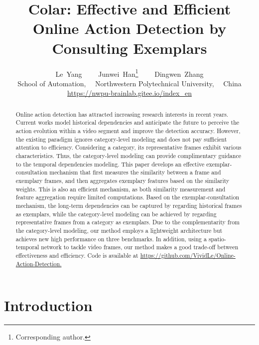 \documentclass[10pt,twocolumn,letterpaper]{article}
\begin{document}
\title{Colar: Effective and Efficient Online Action Detection by Consulting Exemplars}
\author{Le\ Yang \ \ \ \ Junwei\ Han\thanks{Corresponding author.} \ \ \ \ Dingwen\ Zhang \\School of Automation, \ \ Northwestern Polytechnical University, \ \ China \\ \href{https://nwpu-brainlab.gitee.io/index_en}{https://nwpu-brainlab.gitee.io/index\_en} }

\maketitle


\begin{abstract}

Online action detection has attracted increasing research interests in recent years. Current works model historical dependencies and anticipate the future to perceive the action evolution within a video segment and improve the detection accuracy. However, the existing paradigm ignores category-level modeling and does not pay sufficient attention to efficiency. Considering a category, its representative frames exhibit various characteristics. Thus, the category-level modeling can provide complimentary guidance to the temporal dependencies modeling. This paper develops an effective exemplar-consultation mechanism that first measures the similarity between a frame and exemplary frames, and then aggregates exemplary features based on the similarity weights. This is also an efficient mechanism, as both similarity measurement and feature aggregation require limited computations. Based on the exemplar-consultation mechanism, the long-term dependencies can be captured by regarding historical frames as exemplars, while the category-level modeling can be achieved by regarding representative frames from a category as exemplars. Due to the complementarity from the category-level modeling, our method employs a lightweight architecture but achieves new high performance on three benchmarks. In addition, using a spatio-temporal network to tackle video frames, our method makes a good trade-off between effectiveness and efficiency. Code is available at \href{https://github.com/VividLe/Online-Action-Detection}{https://github.com/VividLe/Online-Action-Detection.}

\end{abstract}


\section{Introduction}
\end{document}
